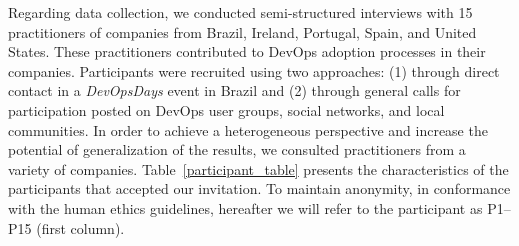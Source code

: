 

Regarding data collection, we conducted semi-structured interviews with 15 practitioners of companies from
Brazil, Ireland, Portugal, Spain, and United States. These practitioners
contributed to DevOps adoption processes in their companies. Participants
were recruited using two approaches: (1) through direct contact in a \emph{DevOpsDays}
event in Brazil and (2) through  general
calls for participation posted on DevOps user groups, social networks,
and local communities. In order to achieve a heterogeneous perspective
and increase the potential of generalization of the results,
we consulted practitioners from a variety of companies.
Table~\ref{participant_table} presents the characteristics of the participants
that accepted our invitation.
To maintain anonymity, in conformance with the human ethics guidelines,
hereafter we will refer to the participant as P1--P15 (first column).


